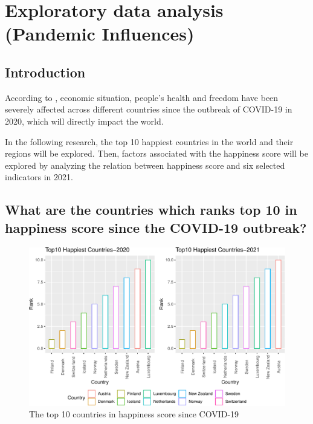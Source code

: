 \documentclass[11pt,a4paper,]{article}
\begin{document}
\newpage

\hypertarget{exploratory-data-analysis-pandemic-influences}{%
\section{Exploratory data analysis (Pandemic Influences)}\label{exploratory-data-analysis-pandemic-influences}}

\hypertarget{introduction-1}{%
\subsection{Introduction}\label{introduction-1}}

According to \textcite{helliwell2021world}, economic situation, people's health and freedom have been severely affected across different countries since the outbreak of COVID-19 in 2020, which will directly impact the world.

In the following research, the top 10 happiest countries in the world and their regions will be explored. Then, factors associated with the happiness score will be explored by analyzing the relation between happiness score and six selected indicators in 2021.

\hypertarget{what-are-the-countries-which-ranks-top-10-in-happiness-score-since-the-covid-19-outbreak}{%
\subsection{What are the countries which ranks top 10 in happiness score since the COVID-19 outbreak?}\label{what-are-the-countries-which-ranks-top-10-in-happiness-score-since-the-covid-19-outbreak}}

\begin{figure}
\centering
\includegraphics{Assignment4_files/figure-latex/top10-1.pdf}
\caption{\label{fig:top10}The top 10 countries in happiness score since COVID-19}
\end{figure}
\end{document}
